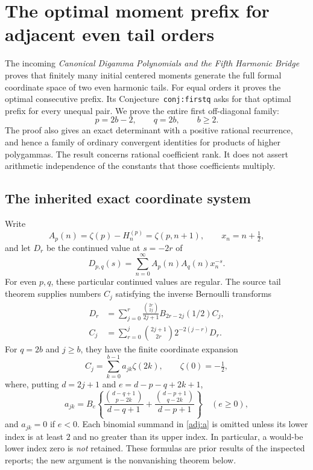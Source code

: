 
\section{The optimal moment prefix for adjacent even tail orders}
\label{adj:section}

The incoming \emph{Canonical Digamma Polynomials and the Fifth Harmonic
Bridge} proves that finitely many initial centered moments generate the
full formal coordinate space of two even harmonic tails.  For equal
orders it proves the optimal consecutive prefix.  Its
Conjecture~\texttt{conj:firstq} asks for that optimal prefix for every
unequal pair.  We prove the entire first off-diagonal family:
\[
 p=2b-2,\qquad q=2b,\qquad b\ge2.
\]
The proof also gives an exact determinant with a positive rational
recurrence, and hence a family of ordinary convergent identities for
products of higher polygammas.  The result concerns rational coefficient
rank.  It does not assert arithmetic independence of the constants that
those coefficients multiply.

\subsection{The inherited exact coordinate system}

Write
\[
 A_p(n)=\zeta(p)-H_n^{(p)}=\zeta(p,n+1),\qquad
 x_n=n+\tfrac12,
\]
and let $D_r$ be the continued value at $s=-2r$ of
\[
 D_{p,q}(s)=\sum_{n=0}^{\infty}A_p(n)A_q(n)x_n^{-s}.
\]
For even $p,q$, these particular continued values are regular.  The
source tail theorem supplies numbers $C_j$ satisfying the inverse
Bernoulli transforms
\begin{align}
 D_r&=\sum_{j=0}^{r}
 \frac{\binom{2r}{2j}}{2j+1}B_{2r-2j}(1/2)C_j,
 \label{adj:forward}\\
 C_j&=\sum_{r=0}^{j}\binom{2j+1}{2r}2^{-2(j-r)}D_r.
 \label{adj:backward}
\end{align}
For $q=2b$ and $j\ge b$, they have the finite coordinate expansion
\begin{equation}\label{adj:block}
 C_j=\sum_{k=0}^{b-1}a_{jk}\zeta(2k),\qquad \zeta(0)=-\tfrac12,
\end{equation}
where, putting $d=2j+1$ and $e=d-p-q+2k+1$,
\begin{equation}\label{adj:a}
 a_{jk}=B_e\left\{
 \frac{\binom{d-q+1}{p-2k}}{d-q+1}
 +\frac{\binom{d-p+1}{q-2k}}{d-p+1}
 \right\}\quad(e\ge0),
\end{equation}
and $a_{jk}=0$ if $e<0$.  Each binomial summand in
\eqref{adj:a} is omitted unless its lower index is at least $2$ and
no greater than its upper index.  In particular, a would-be lower
index zero is \emph{not} retained.  These formulas are prior results
of the inspected reports; the new argument is the nonvanishing theorem
below.

